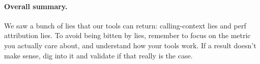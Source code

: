 


\paragraph{Overall summary.} We saw a bunch of lies that our tools can return: calling-context lies and perf attribution lies. To avoid being bitten by lies, remember to focus on the metric you actually care about,
and understand how your tools work. If a result doesn't make sense, dig into it and validate if that really is the case.




